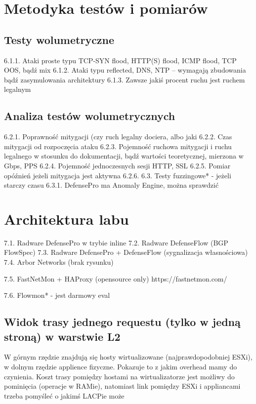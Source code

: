 \chapter{Metodyka testów i pomiarów}

\section{Testy wolumetryczne}
 
6.1.1.	 Ataki proste typu TCP-SYN flood,  HTTP(S) flood, ICMP flood, TCP OOS, bądź mix
6.1.2.	 Ataki typu reflected, DNS, NTP – wymagają zbudowania bądź zasymulowania architektury
6.1.3.	 Zawsze jakiś procent ruchu jest ruchem legalnym
\section{Analiza testów wolumetrycznych}

6.2.1.	 Poprawność mitygacji (czy ruch legalny dociera, albo jaki %
6.2.2.	 Czas mitygacji od rozpoczęcia ataku
6.2.3.	 Pojemność ruchowa mitygacji i ruchu legalnego w stosunku do dokumentacji, bądź wartości teoretycznej, mierzona w Gbps, PPS
6.2.4.	 Pojemność jednoczesnych sesji HTTP, SSL
6.2.5.	 Pomiar opóźnień jeżeli mitygacja jest aktywna
6.2.6.	 
6.3.	Testy fuzzingowe* - jeżeli starczy czasu
6.3.1.	 DefensePro ma Anomaly Engine, można sprawdzić


\chapter{Architektura labu}

7.1.	Radware DefensePro w trybie inline 
7.2.	Radware DefenseFlow (BGP FlowSpec)
7.3.	Radware DefensePro + DefenseFlow (sygnalizacja własnościowa)
7.4.	Arbor Networks
(brak rysunku)

7.5.	FastNetMon + HAProxy (opensource only) 
  https://fastnetmon.com/

7.6.	Flowmon* - jest darmowy eval

\section{Widok trasy jednego requestu (tylko w jedną stroną) w warstwie L2}

W górnym rzędzie znajdują się hosty wirtualizowane (najprawdopodobniej ESXi), w dolnym rzędzie applience fizyczne. Pokazuje to z jakim overhead mamy do czynienia. 
Koszt trasy pomiędzy hostami na wirtualizatorze jest możliwy do pominięcia (operacje w RAMie), natomiast link pomiędzy ESXi i appliancami trzeba pomyśleć o jakimś LACPie może
